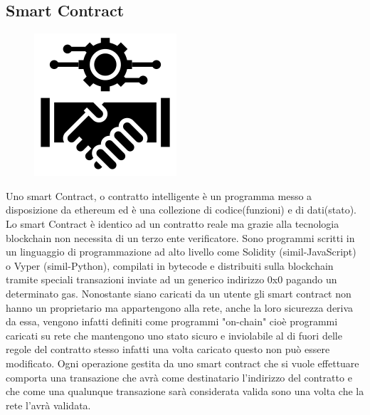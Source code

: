 \documentclass[12pt,titlepage]{report}
\begin{document}
\subsection{Smart Contract}
\begin{figure}
	\includegraphics[height=0.2\textheight]{SmartC}
	\centering
\end{figure}

Uno smart Contract, o contratto intelligente è un programma messo a disposizione da ethereum ed è una collezione di codice(funzioni) e di dati(stato). Lo smart Contract è identico ad un contratto reale ma grazie alla tecnologia blockchain non necessita di un terzo ente verificatore. Sono programmi scritti in un linguaggio di programmazione ad alto livello come Solidity (simil-JavaScript) o Vyper (simil-Python), compilati in bytecode e distribuiti sulla blockchain tramite speciali transazioni inviate ad un generico indirizzo 0x0 pagando un determinato gas. Nonostante siano caricati da un utente gli smart contract non hanno un proprietario ma appartengono alla rete, anche la loro sicurezza deriva da essa, vengono infatti definiti come programmi "on-chain" cioè programmi caricati su rete che mantengono uno stato sicuro e inviolabile al di fuori delle regole del contratto stesso infatti una volta caricato questo non può essere modificato. Ogni operazione gestita da uno smart contract che si vuole effettuare comporta una transazione che avrà come destinatario l'indirizzo del contratto e che come una qualunque transazione sarà considerata valida sono una volta che la rete l'avrà validata.
\end{document}
